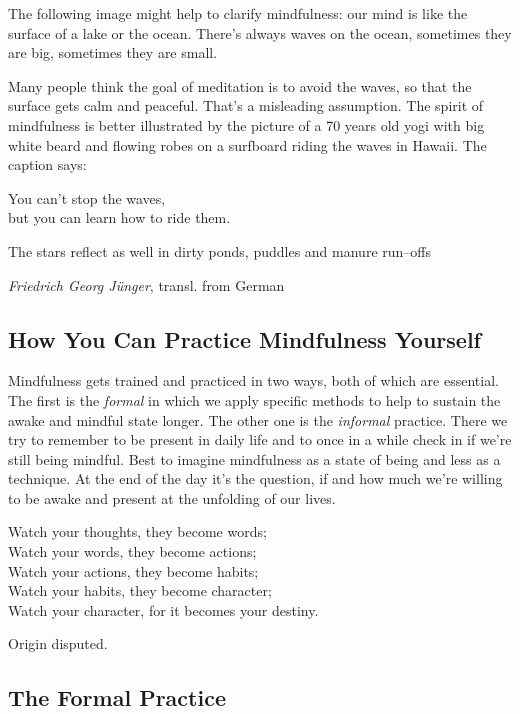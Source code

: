 \documentclass[../Book.Stress_regulation.tex]{subfiles}
\begin{document}
The following image might help to clarify mindfulness: {our mind is like the surface of a lake or the ocean}.
There's always {waves on the ocean}, sometimes they are big, sometimes they are small. 

Many people think the goal of meditation is to avoid the waves, so that the surface gets calm and peaceful. That's a misleading assumption.
The spirit of mindfulness is better illustrated by the picture of a 70 years old yogi with big white beard and flowing robes on a surfboard riding the waves in Hawaii. The caption says:
\begin{center}
You can't stop the waves, \\
but you can learn how to ride them.
\end{center}

\epigraph{The stars reflect as well in dirty ponds, puddles and manure run--offs}{\textit{Friedrich Georg J\"unger}, transl. from German}

\subsection{How You Can Practice Mindfulness Yourself}
Mindfulness gets trained and practiced in two ways, both of which are essential. The first is the \emph{formal} in which we apply specific methods to help to sustain the awake and mindful state longer. The other one is the \emph{informal} practice. There we try to remember to be present in daily life and to once in a while check in if we're still being mindful. Best to imagine mindfulness as a state of being and less as a technique. At the end of the day it's the question, if and how much we're willing to be awake and present at the unfolding of our lives.

\setlength{}
\epigraph{Watch your thoughts, they become words;\\
Watch your words, they become actions;\\
Watch your actions, they become habits;\\
Watch your habits, they become character;\\
Watch your character, for it becomes your destiny.}{Origin disputed.}
\setlength{}

\subsection{The Formal Practice}
\end{document}
